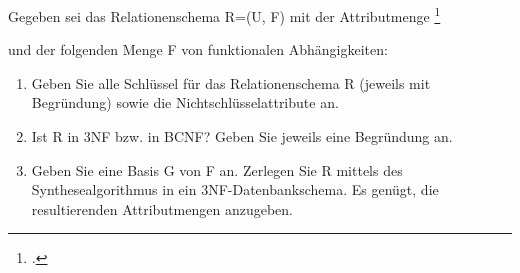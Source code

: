 \documentclass{bschlangaul-aufgabe}
\begin{document}

\let\FA=\bFunktionaleAbhaengigkeiten

Gegeben sei das Relationenschema R=(U, F) mit der Attributmenge
\footcite{examen:66116:2015:03}

\begin{center}
\end{center}

und der folgenden Menge F von funktionalen Abhängigkeiten:

\begin{center}

\FA{
  A -> B;
  A, B, C -> D;
  D -> B, C;
}
\end{center}

\begin{enumerate}


\item Geben Sie alle Schlüssel für das Relationenschema R (jeweils mit
Begründung) sowie die Nichtschlüsselattribute an.


\item Ist R in 3NF bzw. in BCNF? Geben Sie jeweils eine Begründung an.


\item Geben Sie eine Basis G von F an. Zerlegen Sie R mittels des
Synthesealgorithmus in ein 3NF-Datenbankschema. Es genügt, die
resultierenden Attributmengen anzugeben.
\end{enumerate}
\end{document}
